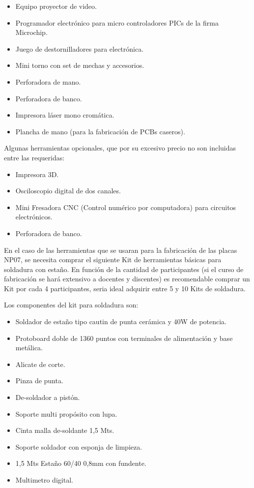 \begin{itemize}
  \item Equipo proyector de video.
  \item Programador electrónico para micro controladores PICs de la firma Microchip\textregistered.
  \item Juego de destornilladores para electrónica.
  \item Mini torno con set de mechas y accesorios.
  \item Perforadora de mano.
  \item Perforadora de banco.
  \item Impresora láser mono cromática.
  \item Plancha de mano (para la fabricación de PCBs caseros).
\end{itemize}

Algunas herramientas opcionales, que por su excesivo precio no son incluidas entre las requeridas:

\begin{itemize}
  \item Impresora 3D.
  \item Osciloscopio digital de dos canales.
  \item Mini Fresadora CNC (Control numérico por computadora) para circuitos electrónicos.
  \item Perforadora de banco. 
\end{itemize}

En el caso de las herramientas que se usaran para la fabricación de las placas NP07, se necesita comprar el siguiente Kit de herramientas básicas para soldadura con estaño. En función de la cantidad de participantes (si el curso de fabricación se hará extensivo a docentes y discentes) es recomendable comprar un Kit por cada 4 participantes, seria ideal adquirir entre 5 y 10 Kits de soldadura.

Los componentes del kit para soldadura son:

\begin{itemize}
  \item Soldador de estaño tipo cautin de punta cerámica y 40W de potencia.
  \item Protoboard doble de 1360 puntos con terminales de alimentación y base metálica.
  \item Alicate de corte.
  \item Pinza de punta.
  \item De-soldador a pistón.
  \item Soporte multi propósito con lupa.
  \item Cinta malla de-soldante 1,5 Mts.
  \item Soporte soldador con esponja de limpieza.
  \item 1,5 Mts Estaño 60/40 0,8mm con fundente.
  \item Multimetro digital.
\end{itemize}

